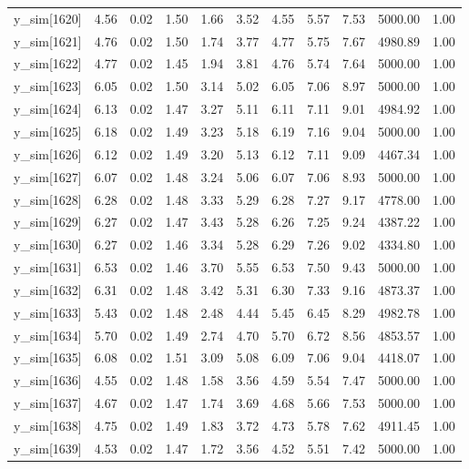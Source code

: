 \begin{table}[ht]
\begin{tabular}{rrrrrrrrrrr}
  y\_sim[1620] & 4.56 & 0.02 & 1.50 & 1.66 & 3.52 & 4.55 & 5.57 & 7.53 & 5000.00 & 1.00 \\ 
  y\_sim[1621] & 4.76 & 0.02 & 1.50 & 1.74 & 3.77 & 4.77 & 5.75 & 7.67 & 4980.89 & 1.00 \\ 
  y\_sim[1622] & 4.77 & 0.02 & 1.45 & 1.94 & 3.81 & 4.76 & 5.74 & 7.64 & 5000.00 & 1.00 \\ 
  y\_sim[1623] & 6.05 & 0.02 & 1.50 & 3.14 & 5.02 & 6.05 & 7.06 & 8.97 & 5000.00 & 1.00 \\ 
  y\_sim[1624] & 6.13 & 0.02 & 1.47 & 3.27 & 5.11 & 6.11 & 7.11 & 9.01 & 4984.92 & 1.00 \\ 
  y\_sim[1625] & 6.18 & 0.02 & 1.49 & 3.23 & 5.18 & 6.19 & 7.16 & 9.04 & 5000.00 & 1.00 \\ 
  y\_sim[1626] & 6.12 & 0.02 & 1.49 & 3.20 & 5.13 & 6.12 & 7.11 & 9.09 & 4467.34 & 1.00 \\ 
  y\_sim[1627] & 6.07 & 0.02 & 1.48 & 3.24 & 5.06 & 6.07 & 7.06 & 8.93 & 5000.00 & 1.00 \\ 
  y\_sim[1628] & 6.28 & 0.02 & 1.48 & 3.33 & 5.29 & 6.28 & 7.27 & 9.17 & 4778.00 & 1.00 \\ 
  y\_sim[1629] & 6.27 & 0.02 & 1.47 & 3.43 & 5.28 & 6.26 & 7.25 & 9.24 & 4387.22 & 1.00 \\ 
  y\_sim[1630] & 6.27 & 0.02 & 1.46 & 3.34 & 5.28 & 6.29 & 7.26 & 9.02 & 4334.80 & 1.00 \\ 
  y\_sim[1631] & 6.53 & 0.02 & 1.46 & 3.70 & 5.55 & 6.53 & 7.50 & 9.43 & 5000.00 & 1.00 \\ 
  y\_sim[1632] & 6.31 & 0.02 & 1.48 & 3.42 & 5.31 & 6.30 & 7.33 & 9.16 & 4873.37 & 1.00 \\ 
  y\_sim[1633] & 5.43 & 0.02 & 1.48 & 2.48 & 4.44 & 5.45 & 6.45 & 8.29 & 4982.78 & 1.00 \\ 
  y\_sim[1634] & 5.70 & 0.02 & 1.49 & 2.74 & 4.70 & 5.70 & 6.72 & 8.56 & 4853.57 & 1.00 \\ 
  y\_sim[1635] & 6.08 & 0.02 & 1.51 & 3.09 & 5.08 & 6.09 & 7.06 & 9.04 & 4418.07 & 1.00 \\ 
  y\_sim[1636] & 4.55 & 0.02 & 1.48 & 1.58 & 3.56 & 4.59 & 5.54 & 7.47 & 5000.00 & 1.00 \\ 
  y\_sim[1637] & 4.67 & 0.02 & 1.47 & 1.74 & 3.69 & 4.68 & 5.66 & 7.53 & 5000.00 & 1.00 \\ 
  y\_sim[1638] & 4.75 & 0.02 & 1.49 & 1.83 & 3.72 & 4.73 & 5.78 & 7.62 & 4911.45 & 1.00 \\ 
  y\_sim[1639] & 4.53 & 0.02 & 1.47 & 1.72 & 3.56 & 4.52 & 5.51 & 7.42 & 5000.00 & 1.00 \\ 

\end{tabular}
\end{table}

